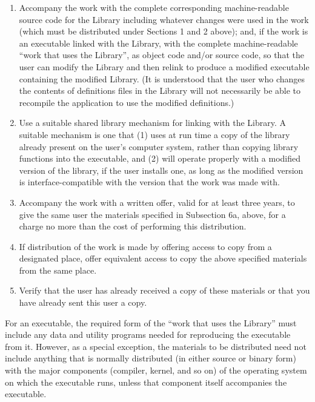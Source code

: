 \documentclass[12pt]{report}
\begin{document}
\begin{enumerate}
\begin{enumerate}
  \item

    Accompany the work with the complete corresponding machine-readable
    source code for the Library including whatever changes were used in
    the work (which must be distributed under Sections 1 and 2 above);
    and, if the work is an executable linked with the Library, with the
    complete machine-readable ``work that uses the Library'', as object
    code and/or source code, so that the user can modify the Library and
    then relink to produce a modified executable containing the modified
    Library.  (It is understood that the user who changes the contents of
    definitions files in the Library will not necessarily be able to
    recompile the application to use the modified definitions.)

  \item

    Use a suitable shared library mechanism for linking with the Library.
    A suitable mechanism is one that (1) uses at run time a copy of the
    library already present on the user's computer system, rather than
    copying library functions into the executable, and (2) will operate
    properly with a modified version of the library, if the user installs
    one, as long as the modified version is interface-compatible with the
    version that the work was made with.

  \item

    Accompany the work with a written offer, valid for at least three
    years, to give the same user the materials specified in Subsection 6a,
    above, for a charge no more than the cost of performing this
    distribution.

  \item

    If distribution of the work is made by offering access to copy from a
    designated place, offer equivalent access to copy the above specified
    materials from the same place.

  \item

    Verify that the user has already received a copy of these materials or
    that you have already sent this user a copy.
\end{enumerate}

For an executable, the required form of the ``work that uses the Library''
must include any data and utility programs needed for reproducing the
executable from it.  However, as a special exception, the materials to be
distributed need not include anything that is normally distributed (in
either source or binary form) with the major components (compiler, kernel,
and so on) of the operating system on which the executable runs, unless
that component itself accompanies the executable.


\end{enumerate}
\end{document}
